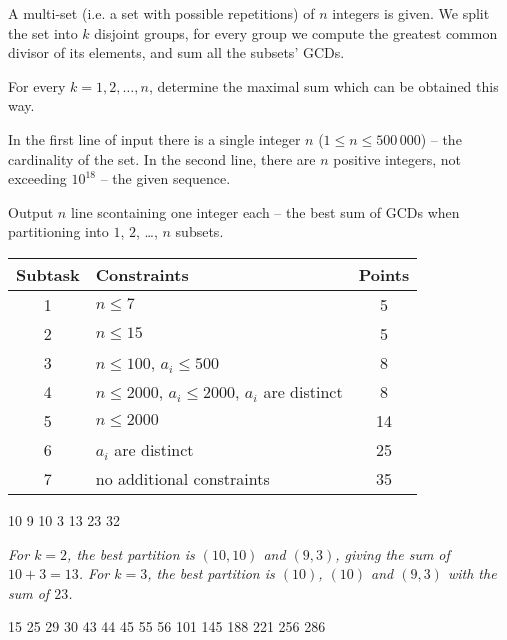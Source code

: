










A multi-set (i.e. a set with possible repetitions) of $n$ integers is given. We split the set into $k$ disjoint groups, for every group we compute the greatest common divisor of its elements, and sum all the subsets' GCDs.

For every $k = 1, 2, \ldots, n$, determine the maximal sum which can be obtained this way.


In the first line of input there is a single integer $n$ ($1 \leq n \leq 500\,000$) -- the cardinality of the set. In the second line, there are $n$ positive integers, not exceeding $10^{18}$ -- the given sequence.


Output $n$ line scontaining one integer each -- the best sum of GCDs when partitioning into $1$, $2$, \ldots, $n$ subsets.


\begin{center}
  \begin{tabular}{|c|p{8cm}|c|}
    \hline
    \textbf{Subtask} & \textbf{Constraints} & \textbf{Points} \\ \hline
    1 & $n \leq 7$ & 5 \\ \hline
    2 & $n \leq 15$ & 5 \\ \hline
    3 & $n \leq 100$, $a_i \leq 500$ & 8 \\ \hline
    4 & $n \leq 2000$, $a_i \leq 2000$, $a_i$ are distinct & 8 \\ \hline
    5 & $n \leq 2000$ & 14 \\ \hline
    6 & $a_i$ are distinct & 25 \\ \hline
    7 & no additional constraints & 35 \\ \hline
  \end{tabular}
\end{center}

10 9 10 3
13
23
32

\sampleEND

\noindent \textit{For $k = 2$, the best partition is $(10,10)$ and $(9,3)$, giving the sum of $10+3 = 13$. For $k=3$, the best partition is $(10)$, $(10)$ and $(9,3)$ with the sum of $23$.}

\medskip

15 25 29 30 43 44 45 55
56
101
145
188
221
256
286

\sampleEND




